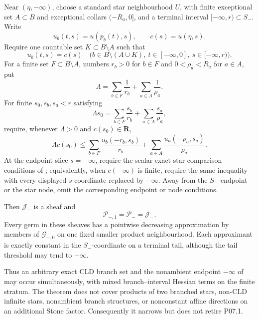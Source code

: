 \begin{theorem}
Near $(\eta,-\infty)$, choose a standard star neighbourhood $U$, with
finite exceptional set $A\subset B$ and exceptional collars
$(-R_a,0]$, and a terminal interval $[-\infty,r)\subset S_-$.  Write
\[
 u_b(t,s)=u(p_b(t),s),\qquad c(s)=u(\eta,s).
\]
Require one countable set $K\subset B\setminus A$ such that
\begin{equation}
 u_b(t,s)=c(s)
 \quad
 \bigl(b\in B\setminus(A\cup K),\ t\in[-\infty,0],\
       s\in[-\infty,r)\bigr).
\label{eq:p071-star-infinite-collar-countable-activity}
\end{equation}
For a finite set $F\subset B\setminus A$, numbers $r_b>0$ for $b\in F$
and $0<\rho_a<R_a$ for $a\in A$, put
\[
 \Lambda=\sum_{b\in F}\frac1{r_b}
              +\sum_{a\in A}\frac1{\rho_a}.
\]
For finite $s_0,s_b,s_a<r$ satisfying
\begin{equation}
 \Lambda s_0=
   \sum_{b\in F}\frac{s_b}{r_b}
      +\sum_{a\in A}\frac{s_a}{\rho_a},
\label{eq:p071-star-infinite-collar-barycentre}
\end{equation}
require, whenever $\Lambda>0$ and $c(s_0)\in\mathbf R$,
\begin{equation}
 \Lambda c(s_0)\leq
   \sum_{b\in F}\frac{u_b(-r_b,s_b)}{r_b}
      +\sum_{a\in A}\frac{u_a(-\rho_a,s_a)}{\rho_a}.
\label{eq:p071-star-infinite-collar-jensen}
\end{equation}
At the endpoint slice $s=-\infty$, require the scalar exact-star
comparison conditions of
; equivalently, when
$c(-\infty)$ is finite, require the same inequality with every displayed
$s$-coordinate replaced by $-\infty$.  Away from the $S_-$-endpoint or
the star node, omit the corresponding endpoint or node conditions.

Then $\mathcal J_-$ is a sheaf and
\begin{equation}
                    \mathcal P_{-,1}=\mathcal P_-=\mathcal J_-.
\label{eq:p071-star-infinite-collar-collapse}
\end{equation}
Every germ in these sheaves has a pointwise decreasing approximation by
members of $\mathcal G_{-,0}$ on one fixed smaller product neighbourhood.
Each approximant is exactly constant in the $S_-$-coordinate on a
terminal tail, although the tail threshold may tend to $-\infty$.

Thus an arbitrary exact CLD branch set and the nonambient endpoint
$-\infty$ of \Cref{thm:p071-cld-infinite-collar-endpoint} may occur
simultaneously, with mixed branch--interval Hessian terms on the finite
stratum.  The theorem does not cover products of two branched stars,
non-CLD infinite stars, nonambient branch structures, or nonconstant
affine directions on an additional Stone factor.  Consequently it
narrows but does not retire P07.1.
\end{theorem}
